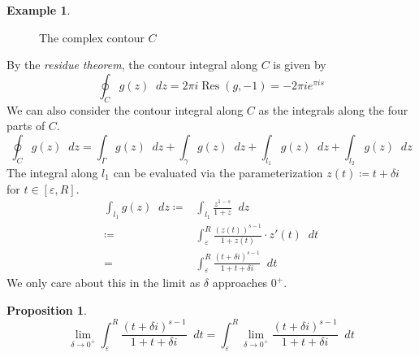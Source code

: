 \documentclass[a4paper]{article}
\newcommand*\diff{\mathop{}\!d} %
\DeclareMathOperator{\Res}{Res}
\newtheorem{proposition}[theorem]{Proposition}
\theoremstyle{definition}
\newtheorem{example}[theorem]{Example}
\begin{document}
\begin{example}
\begin{figure}[H]
{}
        \captionsetup{justification=centering}
        \caption{The complex contour $C$}
        \label{fig:contour}
    \end{figure}
    By the \emph{residue theorem}, the contour integral along $C$ is given by
    \begin{equation*}
        \oint_C g(z) \diff z = 2 \pi i \Res (g, -1) = - 2 \pi i e^{\pi i s}
    \end{equation*}
    We can also consider the contour integral along $C$ as the integrals along the four parts of $C$.
    \begin{equation*}
        \oint_C g(z) \diff z = \int_\Gamma g(z) \diff z + \int_\gamma g(z) \diff z + \int_{l_1} g(z) \diff z + \int_{l_2} g(z) \diff z
    \end{equation*}
    The integral along $l_1$ can be evaluated via the parameterization $z(t) \coloneq t + \delta i$ for $t \in [\varepsilon, R]$.
    \begin{align*}
        \int_{l_1} g(z) \diff z \coloneq & \int_{l_1} \frac{z^{1-s}}{1+z} \diff z                             \\
        \coloneq                         & \int_\varepsilon^R \frac{(z(t))^{s-1}}{1+z(t)} \cdot z'(t) \diff t \\
        =                                & \int_\varepsilon^R \frac{(t+\delta i)^{s-1}}{1+t+\delta i} \diff t
    \end{align*}
    We only care about this in the limit as $\delta$ approaches $0^+$.
    \begin{proposition} \label{thm:delta dct}
        \begin{equation*}
            \lim_{\delta \to 0^+} \int_\varepsilon^R \frac{(t+\delta i)^{s-1}}{1+t+\delta i} \diff t = \int_\varepsilon^R \lim_{\delta \to 0^+} \frac{(t+\delta i)^{s-1}}{1+t+\delta i} \diff t

\end{equation*}
\end{proposition}
\end{example}
\end{document}
